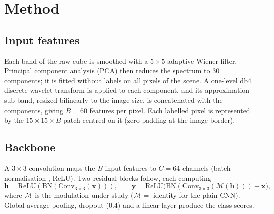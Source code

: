 \documentclass[]{interact}
\begin{document}
\section{Method}\label{sec:method}
\subsection{Input features}
Each band of the raw cube is smoothed with a $5\times5$ adaptive Wiener filter. Principal component analysis (PCA) \citep{jolliffe2016pca} then reduces the spectrum to 30 components; it is fitted without labels on all pixels of the scene. A one-level db4 discrete wavelet transform \citep{mallat1989theory,daubechies1992ten} is applied to each component, and its approximation sub-band, resized bilinearly to the image size, is concatenated with the components, giving $B=60$ features per pixel. Each labelled pixel is represented by the $15\times15\times B$ patch centred on it (zero padding at the image border).

\subsection{Backbone}
A $3\times3$ convolution maps the $B$ input features to $C=64$ channels (batch normalisation \citep{ioffe2015batch}, ReLU). Two residual blocks \citep{he2016deep} follow, each computing
\begin{equation}
\mathbf{h}=\mathrm{ReLU}(\mathrm{BN}(\mathrm{Conv}_{3\times3}(\mathbf{x}))),\qquad
\mathbf{y}=\mathrm{ReLU}\big(\mathrm{BN}(\mathrm{Conv}_{3\times3}(\mathcal{M}(\mathbf{h})))+\mathbf{x}\big),
\end{equation}
where $\mathcal{M}$ is the modulation under study ($\mathcal{M}=$ identity for the plain CNN). Global average pooling, dropout (0.4) \citep{srivastava2014dropout} and a linear layer produce the class scores.
\end{document}
